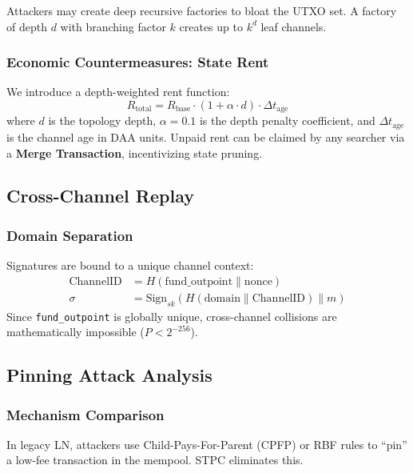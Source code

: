 Attackers may create deep recursive factories to bloat the UTXO set. A factory of depth $d$ with branching factor $k$ creates up to $k^d$ leaf channels.

\subsubsection{Economic Countermeasures: State Rent}
We introduce a depth-weighted rent function:
\begin{equation}
R_{\mathrm{total}} = R_{\mathrm{base}} \cdot (1 + \alpha \cdot d) \cdot \Delta t_{\mathrm{age}}
\end{equation}
where $d$ is the topology depth, $\alpha = 0.1$ is the depth penalty coefficient, and $\Delta t_{\mathrm{age}}$ is the channel age in DAA units. Unpaid rent can be claimed by any searcher via a \textbf{Merge Transaction}, incentivizing state pruning.

\subsection{Cross-Channel Replay}

\subsubsection{Domain Separation}
Signatures are bound to a unique channel context:
\begin{align*}
\mathrm{ChannelID} &= H(\mathrm{fund\_outpoint} \parallel \mathrm{nonce}) \\
\sigma &= \mathrm{Sign}_{sk}(H(\mathrm{domain} \parallel \mathrm{ChannelID}) \parallel m)
\end{align*}
Since \texttt{fund\_outpoint} is globally unique, cross-channel collisions are mathematically impossible ($P < 2^{-256}$).

\subsection{Pinning Attack Analysis}

\subsubsection{Mechanism Comparison}
In legacy LN, attackers use Child-Pays-For-Parent (CPFP) or RBF rules to ``pin'' a low-fee transaction in the mempool. STPC eliminates this.

